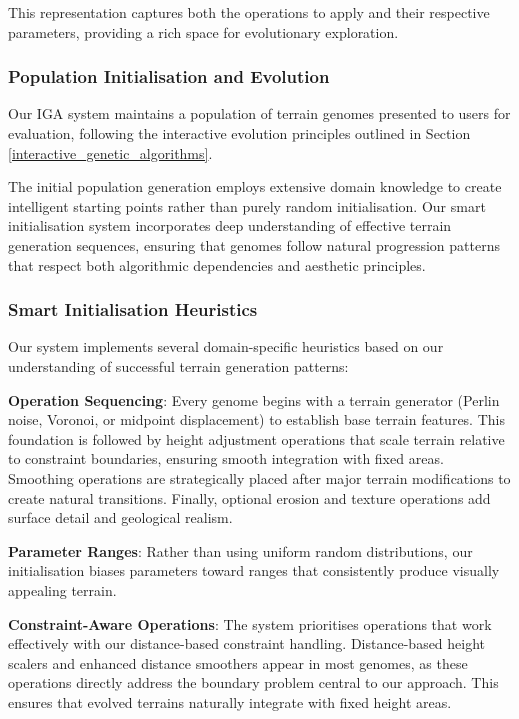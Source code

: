 This representation captures both the operations to apply and their respective parameters, providing a rich space for evolutionary exploration.

\subsubsection{Population Initialisation and Evolution}

Our IGA system maintains a population of terrain genomes presented to users for evaluation, following the interactive evolution principles outlined in Section \ref{interactive_genetic_algorithms}. 

The initial population generation employs extensive domain knowledge to create intelligent starting points rather than purely random initialisation. Our smart initialisation system incorporates deep understanding of effective terrain generation sequences, ensuring that genomes follow natural progression patterns that respect both algorithmic dependencies and aesthetic principles.

\subsubsection{Smart Initialisation Heuristics}

Our system implements several domain-specific heuristics based on our understanding of successful terrain generation patterns:

\textbf{Operation Sequencing}: Every genome begins with a terrain generator (Perlin noise, Voronoi, or midpoint displacement) to establish base terrain features. This foundation is followed by height adjustment operations that scale terrain relative to constraint boundaries, ensuring smooth integration with fixed areas. Smoothing operations are strategically placed after major terrain modifications to create natural transitions. Finally, optional erosion and texture operations add surface detail and geological realism.

\textbf{Parameter Ranges}: Rather than using uniform random distributions, our initialisation biases parameters toward ranges that consistently produce visually appealing terrain. 

\textbf{Constraint-Aware Operations}: The system prioritises operations that work effectively with our distance-based constraint handling. Distance-based height scalers and enhanced distance smoothers appear in most genomes, as these operations directly address the boundary problem central to our approach. This ensures that evolved terrains naturally integrate with fixed height areas.

